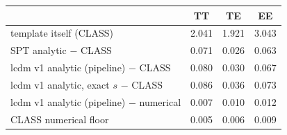 \begin{tabular}{l S[table-format=1.3] S[table-format=1.3] S[table-format=1.3]}
\toprule
 & {TT} & {TE} & {EE} \\
\midrule
template itself (CLASS) & 2.041 & 1.921 & 3.043 \\
SPT analytic $-$ CLASS & 0.071 & 0.026 & 0.063 \\
lcdm v1 analytic (pipeline) $-$ CLASS & 0.080 & 0.030 & 0.067 \\
lcdm v1 analytic, exact $s$ $-$ CLASS & 0.086 & 0.036 & 0.073 \\
lcdm v1 analytic (pipeline) $-$ numerical & 0.007 & 0.010 & 0.012 \\
CLASS numerical floor & 0.005 & 0.006 & 0.009 \\
\bottomrule
\end{tabular}
